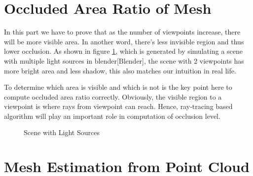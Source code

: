\documentclass[11pt, a4paper,oneside,chapterprefix=false]{scrbook}
\newcommand{\FIXME}[1]{{\color{RED}{\textbf{FIX}: #1}}}
\begin{document}
\section{Occluded Area Ratio of Mesh} \label{sec:occluded area ratio of mesh}

In this part we have to prove that as the number of viewpoints increase, there will be more visible area. \FIXME{rephrase}In another word, there's less invisible region and thus lower occlusion. As shown in figure \ref{fig:scene with light sources}, which is generated by simulating a scene with multiple light sources in blender[Blender], the scene with 2 viewpoints has more bright area and less shadow, this also matches our intuition in real life. 

\vspace{10pt}

To determine which area is visible and which is not is the key point here to compute occluded area ratio correctly. Obviously, the visible region to a viewpoint is where rays from viewpoint can reach. Hence, ray-tracing based algorithm will play an important role in computation of occlusion level.  

\begin{figure}[H]
    \centering
     \hfill
    \caption{Scene with Light Sources}
    \label{fig:scene with light sources}
\end{figure}

\section{Mesh Estimation from Point Cloud} \label{mesh estimation of point cloud}
\end{document}
